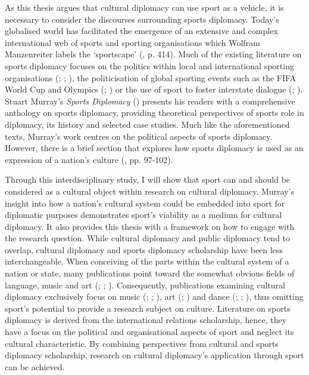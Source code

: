 As this thesis argues that cultural diplomacy can use sport as a vehicle, it is necessary to consider the discourses surrounding sports diplomacy. Today’s globalised world has facilitated the emergence of an extensive and complex international web of sports and sporting organisations which Wolfram Manzenreiter labels the ‘sportscape’ (\citeyear{manzenreiter2008}, p. 414). Much of the existing literature on sports diplomacy focuses on the politics within local and international sporting organisations (\cite{holt1999}; \cite{tomlinson2016}; \cite{cooley2018}), the politicisation of global sporting events such as the FIFA World Cup and Olympics (\cite{xu2008}; \cite{dowse2018}) or the use of sport to foster interstate dialogue (\cite{rowe2018}; \cite{shuman2018}). Stuart Murray’s \textit{Sports Diplomacy} (\citeyear{murray2018}) presents his readers with a comprehensive anthology on sports diplomacy, providing theoretical perspectives of sports role in diplomacy, its history and selected case studies. Much like the aforementioned texts, Murray’s work centres on the political aspects of sports diplomacy. However, there is a brief section that explores how sports diplomacy is used as an expression of a nation’s culture (\cite{murray2018}, pp. 97-102).

Through this interdisciplinary study, I will show that sport can and should be considered as a cultural object within research on cultural diplomacy. Murray’s insight into how a nation’s cultural system could be embedded into sport for diplomatic purposes demonstrates sport’s viability as a medium for cultural diplomacy. It also provides this thesis with a framework on how to engage with the research question. While cultural diplomacy and public diplomacy tend to overlap, cultural diplomacy and sports diplomacy scholarship have been less interchangeable. When conceiving of the parts within the cultural system of a nation or state, many publications point toward the somewhat obvious fields of language, music and art (\cite{hanna1987}; \cite{blackingetal1995}; \cite{clifford1998}). Consequently, publications examining cultural diplomacy exclusively focus on music (\cite{fosler-lussier2015}; \cite{mikkonensuutari2016}; \cite{saito2020}), art (\cite{barnhisel2015}; \cite{mikkonensuutari2016}) and dance (\cite{prevots1998}; \cite{kodat2014}; \cite{mcdaniel2014}), thus omitting sport’s potential to provide a research subject on culture. Literature on sports diplomacy is derived from the international relations scholarship, hence, they have a focus on the political and organisational aspects of sport and neglect its cultural characteristic. By combining perspectives from cultural and sports diplomacy scholarship, research on cultural diplomacy’s application through sport can be achieved.

